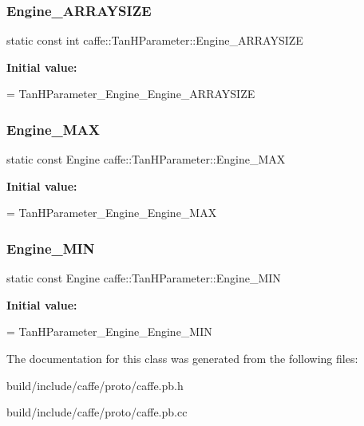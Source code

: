 \subsubsection{\texorpdfstring{Engine\+\_\+\+A\+R\+R\+A\+Y\+S\+I\+ZE}{Engine\_ARRAYSIZE}}
{\footnotesize\ttfamily static const int caffe\+::\+Tan\+H\+Parameter\+::\+Engine\+\_\+\+A\+R\+R\+A\+Y\+S\+I\+ZE\hspace{0.3cm}{\ttfamily [static]}}

{\bfseries Initial value\+:}
\begin{DoxyCode}
=
    TanHParameter\_Engine\_Engine\_ARRAYSIZE
\end{DoxyCode}
\mbox{\label{classcaffe_1_1_tan_h_parameter_a0947f180fe16e1078173379afe544821}} 
\subsubsection{\texorpdfstring{Engine\+\_\+\+M\+AX}{Engine\_MAX}}
{\footnotesize\ttfamily static const Engine caffe\+::\+Tan\+H\+Parameter\+::\+Engine\+\_\+\+M\+AX\hspace{0.3cm}{\ttfamily [static]}}

{\bfseries Initial value\+:}
\begin{DoxyCode}
=
    TanHParameter\_Engine\_Engine\_MAX
\end{DoxyCode}
\mbox{\label{classcaffe_1_1_tan_h_parameter_a04ccd55b4ff16b8dc42157acc3d319e2}} 
\subsubsection{\texorpdfstring{Engine\+\_\+\+M\+IN}{Engine\_MIN}}
{\footnotesize\ttfamily static const Engine caffe\+::\+Tan\+H\+Parameter\+::\+Engine\+\_\+\+M\+IN\hspace{0.3cm}{\ttfamily [static]}}

{\bfseries Initial value\+:}
\begin{DoxyCode}
=
    TanHParameter\_Engine\_Engine\_MIN
\end{DoxyCode}


The documentation for this class was generated from the following files\+:\begin{DoxyCompactItemize}
\item 
build/include/caffe/proto/caffe.\+pb.\+h\item 
build/include/caffe/proto/caffe.\+pb.\+cc\end{DoxyCompactItemize}
